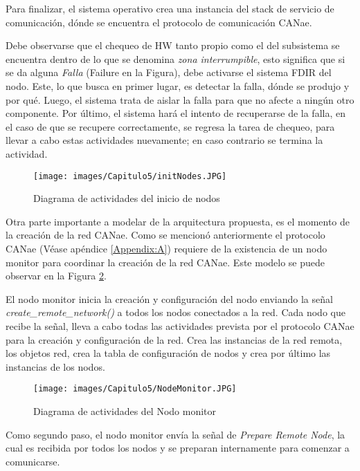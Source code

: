 Para finalizar, el sistema operativo crea una instancia del stack de servicio de
comunicación, dónde se encuentra el protocolo de comunicación CANae.

Debe observarse que el chequeo de \ac{HW} tanto propio como el del
subsistema se encuentra dentro de lo que se denomina \textit{zona interrumpible},
esto significa que si se da alguna \textit{Falla} (Failure en la Figura), debe
activarse el sistema FDIR del nodo. Este, lo que busca en primer lugar,
es detectar la falla, dónde se produjo y por qué. Luego, el sistema trata de
aislar la falla para que no afecte a ningún otro componente. Por último, el
sistema hará el intento de recuperarse de la falla, en el caso de que se
recupere correctamente, se regresa la tarea de chequeo, para
llevar a cabo estas actividades nuevamente; en caso contrario se termina la actividad.

\begin{figure}[h!]
 \centering
 \texttt{[image: images/Capitulo5/initNodes.JPG]}
  \caption{Diagrama de actividades del inicio de nodos}
  \label{fig:initNodes}
\end{figure}

Otra parte importante a modelar de la arquitectura propuesta, es el momento
de la creación de la red CANae. Como se mencionó anteriormente el protocolo
CANae (Véase apéndice \ref{Appendix:A}) requiere de la existencia de un nodo monitor
para coordinar la creación de la red CANae. Este modelo se puede observar
en la Figura \ref{fig:NodeMonitor}.

El nodo monitor inicia la creación y configuración del nodo enviando la
señal \textit{create\_remote\_network()} a todos los nodos conectados a la
red. Cada nodo que recibe la señal, lleva a cabo todas las actividades prevista
por el protocolo CANae para la creación y configuración de la red. Crea las instancias
de la red remota, los objetos red, crea la tabla de configuración de nodos y crea
por último las instancias de los nodos.

\begin{figure}[h!]
 \centering
 \texttt{[image: images/Capitulo5/NodeMonitor.JPG]}
  \caption{Diagrama de actividades del Nodo monitor}
  \label{fig:NodeMonitor}
\end{figure}

Como segundo paso, el nodo monitor envía la señal de \textit{Prepare Remote Node}, la
cual es recibida por todos los nodos y se preparan internamente para comenzar a
comunicarse.

